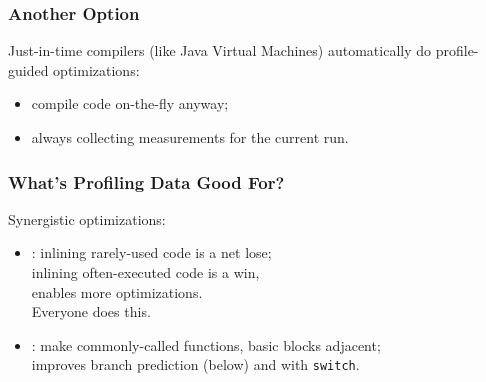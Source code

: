 \documentclass[aspectratio=43]{beamer}
\newenvironment{changemargin}[1]{%
  \begin{list}{}{%
    \setlength{\topsep}{0pt}%
    \setlength{\leftmargin}{#1}%
    \setlength{\rightmargin}{1em}
    \setlength{\listparindent}{\parindent}%
    \setlength{\itemindent}{\parindent}%
    \setlength{\parsep}{\parskip}%
  }%
  \item[]}{\end{list}}
\begin{document}
\begin{frame}
  \frametitle{Another Option}
  \begin{changemargin}{2cm}
    Just-in-time compilers (like Java Virtual Machines)
    automatically do profile-guided optimizations:
\begin{itemize}
\item compile code on-the-fly anyway;
\item always collecting measurements for the current run.
\end{itemize}


  \end{changemargin}

\end{frame}

\begin{frame}
  \frametitle{What's Profiling Data Good For?}
  \begin{changemargin}{2cm}
Synergistic optimizations:
\begin{itemize}
\item {}: inlining rarely-used code is a net lose; \\
inlining often-executed code is a win, \\
\qquad enables more optimizations.\\[1em]
Everyone does this.\\[1em]

\item {}: make commonly-called functions, basic blocks adjacent;\\
improves branch prediction (below) and with {\tt switch}.

\end{itemize}


  \end{changemargin}

\end{frame}

\end{document}
